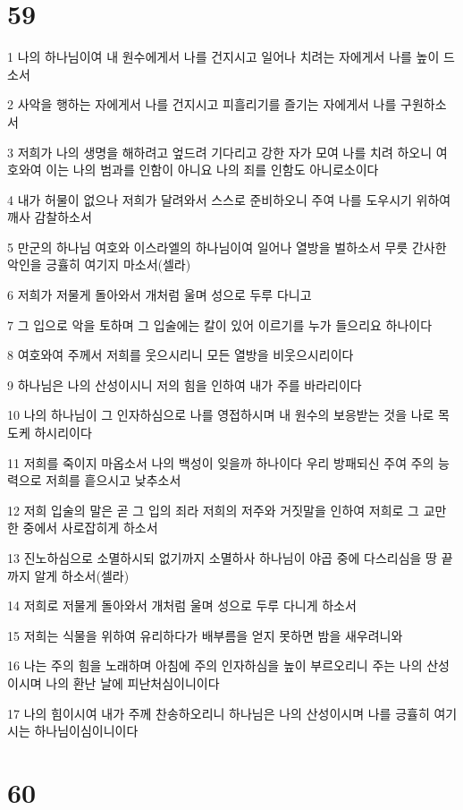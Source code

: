 \chapter{59}

\par 1 나의 하나님이여 내 원수에게서 나를 건지시고 일어나 치려는 자에게서 나를 높이 드소서
\par 2 사악을 행하는 자에게서 나를 건지시고 피흘리기를 즐기는 자에게서 나를 구원하소서
\par 3 저희가 나의 생명을 해하려고 엎드려 기다리고 강한 자가 모여 나를 치려 하오니 여호와여 이는 나의 범과를 인함이 아니요 나의 죄를 인함도 아니로소이다
\par 4 내가 허물이 없으나 저희가 달려와서 스스로 준비하오니 주여 나를 도우시기 위하여 깨사 감찰하소서
\par 5 만군의 하나님 여호와 이스라엘의 하나님이여 일어나 열방을 벌하소서 무릇 간사한 악인을 긍휼히 여기지 마소서(셀라)
\par 6 저희가 저물게 돌아와서 개처럼 울며 성으로 두루 다니고
\par 7 그 입으로 악을 토하며 그 입술에는 칼이 있어 이르기를 누가 들으리요 하나이다
\par 8 여호와여 주께서 저희를 웃으시리니 모든 열방을 비웃으시리이다
\par 9 하나님은 나의 산성이시니 저의 힘을 인하여 내가 주를 바라리이다
\par 10 나의 하나님이 그 인자하심으로 나를 영접하시며 내 원수의 보응받는 것을 나로 목도케 하시리이다
\par 11 저희를 죽이지 마옵소서 나의 백성이 잊을까 하나이다 우리 방패되신 주여 주의 능력으로 저희를 흩으시고 낮추소서
\par 12 저희 입술의 말은 곧 그 입의 죄라 저희의 저주와 거짓말을 인하여 저희로 그 교만한 중에서 사로잡히게 하소서
\par 13 진노하심으로 소멸하시되 없기까지 소멸하사 하나님이 야곱 중에 다스리심을 땅 끝까지 알게 하소서(셀라)
\par 14 저희로 저물게 돌아와서 개처럼 울며 성으로 두루 다니게 하소서
\par 15 저희는 식물을 위하여 유리하다가 배부름을 얻지 못하면 밤을 새우려니와
\par 16 나는 주의 힘을 노래하며 아침에 주의 인자하심을 높이 부르오리니 주는 나의 산성이시며 나의 환난 날에 피난처심이니이다
\par 17 나의 힘이시여 내가 주께 찬송하오리니 하나님은 나의 산성이시며 나를 긍휼히 여기시는 하나님이심이니이다

\chapter{60}

